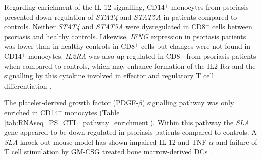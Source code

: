 Regarding enrichment of the IL-12 signalling, CD14$^+$ monocytes from psoriasis presented down-regulation of \textit{STAT4} and \textit{STAT5A} in patients compared to controls. Neither \textit{STAT4} and \textit{STAT5A} were dysregulated in CD8$^+$ cells between psoriasis and healthy controls. Likewise, \textit{IFNG} expression in psoriasis patients was lower than in healthy controls in CD8$^+$ cells but changes were not found in CD14$^+$ monocytes. \textit{IL2RA} was also up-regulated in CD8$^+$ from psoriasis patients when compared to controls, which may enhance formation of the IL2-R$\alpha$ and the signalling by this cytokine involved in effector and regulatory T cell differentiation \parencite{Malek2010}.




The platelet-derived growth factor (PDGF-$\beta$) signalling pathway was only enriched in CD14$^+$ monocytes (Table \ref{tab:RNAseq_PS_CTL_pathway_enrichment}). Within this pathway the \textit{SLA} gene appeared to be down-regulated in psoriasis patients compared to controls. A \textit{SLA} knock-out mouse model has shown impaired IL-12 and TNF-$\alpha$ and failure of T cell stimulation by GM-CSG treated bone marrow-derived DCs \parencite{Liontos2011}.

